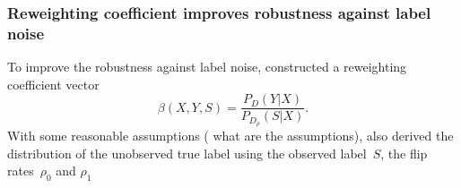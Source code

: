 \documentclass[12pt]{article} %
\begin{document}
\subsubsection{Reweighting coefficient improves robustness against label noise}
To improve the robustness against label noise, \citet{liu2016classification} constructed a reweighting coefficient vector~
\begin{equation}
\beta(X,Y,S)=\frac{P_D(Y|X)}{P_{D_\rho}(S|X)}. \label{beta}
\end{equation}
With some reasonable assumptions ({\color{red} what are the assumptions}), \citet{liu2016classification} also derived the distribution of the unobserved  true label using the observed label~$S$, the flip rates~$\rho_{0}$ and $\rho_{1}$
\end{document}
